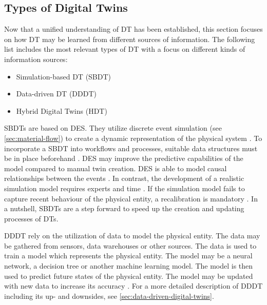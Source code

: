 \subsection{Types of Digital Twins}
\label{sec:types-digital-twins}
Now that a unified understanding of DT has been established, this section focuses on how DT may be learned from different sources of information. The following list includes the most relevant types of DT with a focus on different kinds of information sources:

\begin{itemize}
  \item Simulation-based DT (SBDT) \autocite{Lugaresi2021aifac,martinez2018automatic}
  \item Data-driven DT (DDDT) \autocite{he2019data,Friederich2022}
  \item Hybrid Digital Twins (HDT) \autocite{luo2020hybrid,huang2023hybrid}
\end{itemize}


SBDTs \autocite{Lugaresi2021aifac,martinez2018automatic,boschert2016digital} are based on DES. They utilize discrete event simulation (see \autoref{sec:material-flow}) to create a dynamic representation of the physical system \autocite{schluse2016simulation,pantelides2013online}. To incorporate a SBDT into workflows and processes, suitable data structures must be in place beforehand \autocite{boschert2016digital}. DES may improve the predictive capabilities of the model compared to manual twin creation. DES is able to model causal relationships between the events \autocite{francis2021towards}. In contrast, the development of a realistic simulation model requires experts and time \autocite{Charpentier2014}. If the simulation model fails to capture recent behaviour of the physical entity, a recalibration is mandatory \autocite{Friederich2022}. In a nutshell, SBDTs are a step forward to speed up the creation and updating processes of DTs.

DDDT rely on the utilization of data to model the physical entity. The data may be gathered from sensors, data warehouses or other sources. The data is used to train a model which represents the physical entity. The model may be a neural network, a decision tree or another machine learning model. The model is then used to predict future states of the physical entity. The model may be updated with new data to increase its accuracy \autocite{he2019data,Friederich2022}. For a more detailed description of DDDT including its up- and downsides, see \autoref{sec:data-driven-digital-twins}.

